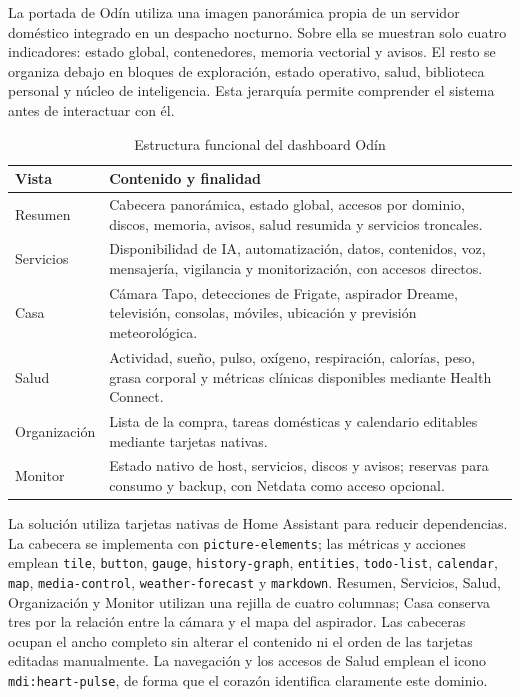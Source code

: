 La portada de Odín utiliza una imagen panorámica propia de un servidor doméstico integrado en un despacho nocturno. Sobre ella se muestran solo cuatro indicadores: estado global, contenedores, memoria vectorial y avisos. El resto se organiza debajo en bloques de exploración, estado operativo, salud, biblioteca personal y núcleo de inteligencia. Esta jerarquía permite comprender el sistema antes de interactuar con él.

\begin{table}[H]
  \centering
  \caption{Estructura funcional del dashboard Odín}
  \label{tab:dashboard-odin-vistas}
  \begin{tabularx}{\textwidth}{lX}
    \toprule
    Vista & Contenido y finalidad \\
    \midrule
    Resumen & Cabecera panorámica, estado global, accesos por dominio, discos, memoria, avisos, salud resumida y servicios troncales. \\
    Servicios & Disponibilidad de IA, automatización, datos, contenidos, voz, mensajería, vigilancia y monitorización, con accesos directos. \\
    Casa & Cámara Tapo, detecciones de Frigate, aspirador Dreame, televisión, consolas, móviles, ubicación y previsión meteorológica. \\
    Salud & Actividad, sueño, pulso, oxígeno, respiración, calorías, peso, grasa corporal y métricas clínicas disponibles mediante Health Connect. \\
    Organización & Lista de la compra, tareas domésticas y calendario editables mediante tarjetas nativas. \\
    Monitor & Estado nativo de host, servicios, discos y avisos; reservas para consumo y backup, con Netdata como acceso opcional. \\
    \bottomrule
  \end{tabularx}
\end{table}

La solución utiliza tarjetas nativas de Home Assistant para reducir dependencias. La cabecera se implementa con \texttt{picture-elements}; las métricas y acciones emplean \texttt{tile}, \texttt{button}, \texttt{gauge}, \texttt{history-graph}, \texttt{entities}, \texttt{todo-list}, \texttt{calendar}, \texttt{map}, \texttt{media-control}, \texttt{weather-forecast} y \texttt{markdown}. Resumen, Servicios, Salud, Organización y Monitor utilizan una rejilla de cuatro columnas; Casa conserva tres por la relación entre la cámara y el mapa del aspirador. Las cabeceras ocupan el ancho completo sin alterar el contenido ni el orden de las tarjetas editadas manualmente. La navegación y los accesos de Salud emplean el icono \texttt{mdi:heart-pulse}, de forma que el corazón identifica claramente este dominio.

